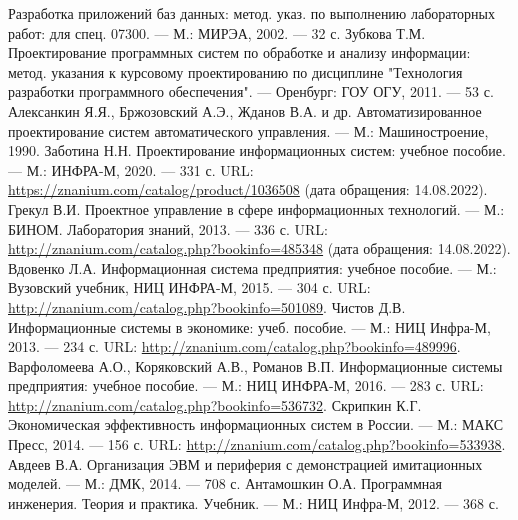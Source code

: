 

\begin{thebibliography}{2}
	 Разработка приложений баз данных: метод. указ.
		по выполнению лабораторных работ:
		для спец. 07300. — М.: МИРЭА, 2002. — 32 с.
	 Зубкова Т.М. Проектирование программных систем по обработке
		и анализу информации: метод.
		указания к курсовому проектированию по дисциплине
		"Технология разработки программного обеспечения".
		— Оренбург: ГОУ ОГУ, 2011. — 53 с.
	 Алексанкин Я.Я., Бржозовский А.Э., Жданов В.А. и др. Автоматизированное проектирование систем автоматического управления. — М.: Машиностроение, 1990.
	 Заботина Н.Н. Проектирование информационных систем: учебное пособие. — М.: ИНФРА-М, 2020. — 331 с. URL: \url{https://znanium.com/catalog/product/1036508} (дата обращения: 14.08.2022).
	 Грекул В.И. Проектное управление в сфере информационных технологий. — М.: БИНОМ. Лаборатория знаний, 2013. — 336 с. URL: \url{http://znanium.com/catalog.php?bookinfo=485348} (дата обращения: 14.08.2022).
	 Вдовенко Л.А. Информационная система предприятия: учебное пособие. — М.: Вузовский учебник, НИЦ ИНФРА-М, 2015. — 304 с. URL: \url{http://znanium.com/catalog.php?bookinfo=501089}.
	 Чистов Д.В. Информационные системы в экономике: учеб. пособие. — М.: НИЦ Инфра-М, 2013. — 234 с. URL: \url{http://znanium.com/catalog.php?bookinfo=489996}.
	 Варфоломеева А.О., Коряковский А.В., Романов В.П. Информационные системы предприятия: учебное пособие. — М.: НИЦ ИНФРА-М, 2016. — 283 с. URL: \url{http://znanium.com/catalog.php?bookinfo=536732}.
	 Скрипкин К.Г. Экономическая эффективность информационных систем в России. — М.: МАКС Пресс, 2014. — 156 с. URL: \url{http://znanium.com/catalog.php?bookinfo=533938}.
	 Авдеев В.А. Организация ЭВМ и периферия с демонстрацией имитационных моделей. — М.: ДМК, 2014. — 708 с.
	 Антамошкин О.А. Программная инженерия. Теория и практика. Учебник. — М.: НИЦ Инфра-М, 2012. — 368 с.

\end{thebibliography}

